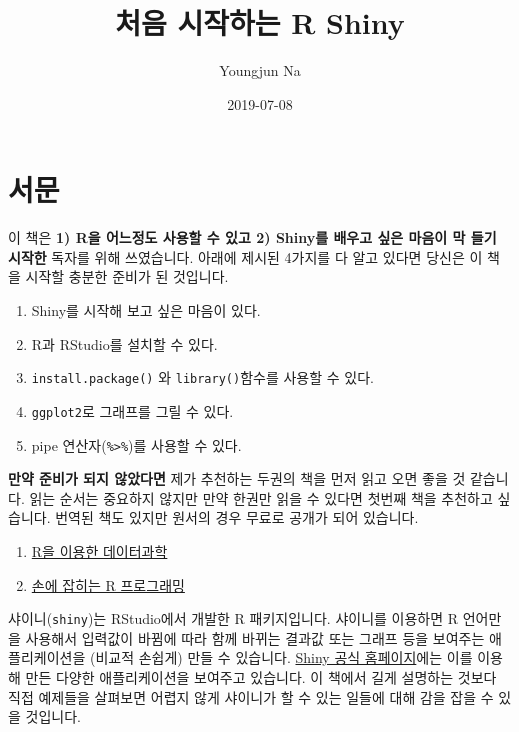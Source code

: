 \documentclass[]{book}
\title{처음 시작하는 R Shiny}
\author{Youngjun Na}
\date{2019-07-08}
\providecommand{\tightlist}{%
  \setlength{\itemsep}{0pt}\setlength{\parskip}{0pt}}
\begin{document}
\maketitle

{
\setcounter{tocdepth}{1}
\tableofcontents
}
\chapter{서문}\label{intro}

이 책은 \textbf{1) R을 어느정도 사용할 수 있고 2) Shiny를 배우고 싶은
마음이 막 들기 시작한} 독자를 위해 쓰였습니다. 아래에 제시된 4가지를 다
알고 있다면 당신은 이 책을 시작할 충분한 준비가 된 것입니다.

\begin{enumerate}
\def\labelenumi{\arabic{enumi}.}
\setcounter{enumi}{-1}
\tightlist
\item
  Shiny를 시작해 보고 싶은 마음이 있다.
\item
  R과 RStudio를 설치할 수 있다.
\item
  \texttt{install.package()} 와 \texttt{library()}함수를 사용할 수 있다.
\item
  \texttt{ggplot2}로 그래프를 그릴 수 있다.
\item
  pipe 연산자(\texttt{\%\textgreater{}\%})를 사용할 수 있다.
\end{enumerate}

\textbf{만약 준비가 되지 않았다면} 제가 추천하는 두권의 책을 먼저 읽고
오면 좋을 것 같습니다. 읽는 순서는 중요하지 않지만 만약 한권만 읽을 수
있다면 첫번째 책을 추천하고 싶습니다. 번역된 책도 있지만 원서의 경우
무료로 공개가 되어 있습니다.

\begin{enumerate}
\def\labelenumi{\arabic{enumi}.}
\tightlist
\item
  \href{https://r4ds.had.co.nz/}{R을 이용한 데이터과학}
\item
  \href{https://rstudio-education.github.io/hopr/}{손에 잡히는 R
  프로그래밍}
\end{enumerate}

샤이니(\texttt{shiny})는 RStudio에서 개발한 R 패키지입니다. 샤이니를
이용하면 R 언어만을 사용해서 입력값이 바뀜에 따라 함께 바뀌는 결과값
또는 그래프 등을 보여주는 애플리케이션을 (비교적 손쉽게) 만들 수
있습니다. \href{https://shiny.rstudio.com/gallery/}{Shiny 공식
홈페이지}에는 이를 이용해 만든 다양한 애플리케이션을 보여주고 있습니다.
이 책에서 길게 설명하는 것보다 직접 예제들을 살펴보면 어렵지 않게
샤이니가 할 수 있는 일들에 대해 감을 잡을 수 있을 것입니다.
\end{document}
